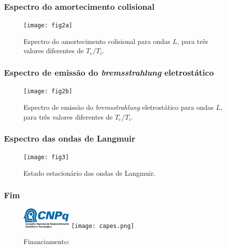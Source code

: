 \documentclass[10pt,aspectratio=1610,lualatex]{beamer}
\begin{document}
\begin{frame}
  \frametitle{Espectro do amortecimento colisional}
  \begin{figure}
    \centering
    \texttt{[image: fig2a]}
    \caption*{Espectro do amortecimento colisional para ondas $L$, para
      três valores diferentes de $T_e/T_i$.}
  \end{figure}
\end{frame}

\begin{frame}
  \frametitle{Espectro de emissão do \emph{bremsstrahlung} eletrostático}
  \begin{figure}
    \centering
    \texttt{[image: fig2b]}
    \caption*{Espectro de emissão do \emph{bremsstrahlung} eletrostático
      para ondas $L$, para três valores diferentes de $T_e/T_i$.}
  \end{figure}
\end{frame}

\begin{frame}
  \frametitle{Espectro das ondas de Langmuir}
  \begin{figure}
    \centering
    \texttt{[image: fig3]}
    \caption*{Estado estacionário das ondas de Langmuir.}
  \end{figure}
\end{frame}

\begin{frame}
  \frametitle{Fim}
  \vspace{1.2cm}

  \vspace{1.2cm}

  \begin{figure}
    \caption*{Financiamento:}
    \centering
    \includegraphics[width=0.22\textwidth]{cnpq.png}
    \hspace{1cm} \texttt{[image: capes.png]}
  \end{figure}
\end{frame}
\end{document}
